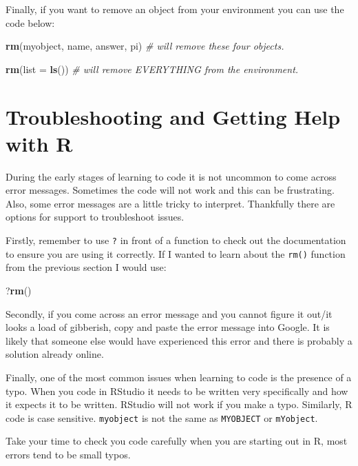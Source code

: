 \documentclass[
]{book}
\newenvironment{Shaded}{\begin{snugshade}}{\end{snugshade}}
\newcommand{\AttributeTok}[1]{\textcolor[rgb]{0.13,0.29,0.53}{#1}}
\newcommand{\CommentTok}[1]{\textcolor[rgb]{0.56,0.35,0.01}{\textit{#1}}}
\newcommand{\FunctionTok}[1]{\textcolor[rgb]{0.13,0.29,0.53}{\textbf{#1}}}
\newcommand{\NormalTok}[1]{#1}
\let\oldsection\section
\renewcommand{\section}{\needspace{5\baselineskip}\oldsection}
\begin{document}
Finally, if you want to remove an object from your environment you can use the code below:

\begin{Shaded}
\begin{Highlighting}[]
\FunctionTok{rm}\NormalTok{(myobject, name, answer, pi) }\CommentTok{\# will remove these four objects.}

\FunctionTok{rm}\NormalTok{(}\AttributeTok{list =} \FunctionTok{ls}\NormalTok{()) }\CommentTok{\# will remove EVERYTHING from the environment.}
\end{Highlighting}
\end{Shaded}

\section{Troubleshooting and Getting Help with R}\label{troubleshooting-and-getting-help-with-r}

During the early stages of learning to code it is not uncommon to come across error messages. Sometimes the code will not work and this can be frustrating. Also, some error messages are a little tricky to interpret. Thankfully there are options for support to troubleshoot issues.

Firstly, remember to use \texttt{?} in front of a function to check out the documentation to ensure you are using it correctly. If I wanted to learn about the \texttt{rm()} function from the previous section I would use:

\begin{Shaded}
\begin{Highlighting}[]
\NormalTok{?}\FunctionTok{rm}\NormalTok{()}
\end{Highlighting}
\end{Shaded}

Secondly, if you come across an error message and you cannot figure it out/it looks a load of gibberish, copy and paste the error message into Google. It is likely that someone else would have experienced this error and there is probably a solution already online.

Finally, one of the most common issues when learning to code is the presence of a typo. When you code in RStudio it needs to be written very specifically and how it expects it to be written. RStudio will not work if you make a typo. Similarly, R code is case sensitive. \texttt{myobject} is not the same as \texttt{MYOBJECT} or \texttt{mYobject}.

Take your time to check you code carefully when you are starting out in R, most errors tend to be small typos.
\end{document}
